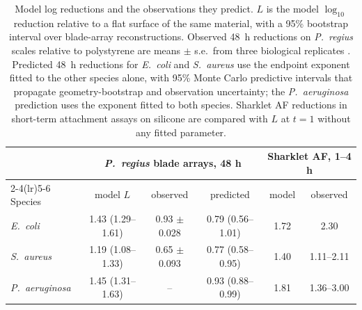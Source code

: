 \begin{table}[t]
\centering
\caption{Model log reductions and the observations they predict. $L$ is the model $\log_{10}$ reduction relative to a flat surface of the same material, with a 95\% bootstrap interval over \EnsN{} blade-array reconstructions. Observed 48~h reductions on \textit{P.~regius} scales relative to polystyrene are means $\pm$ s.e.\ from three biological replicates \cite{Peroutka2026}. Predicted 48~h reductions for \textit{E.~coli} and \textit{S.~aureus} use the endpoint exponent fitted to the other species alone, with 95\% Monte Carlo predictive intervals that propagate geometry-bootstrap and observation uncertainty; the \textit{P.~aeruginosa} prediction uses the exponent fitted to both species. Sharklet AF reductions in short-term attachment assays on silicone \cite{May2014,Xu2017} are compared with $L$ at $t=1$ without any fitted parameter.}
\label{tab:main}
\small
\begin{tabular}{lccccc}
\toprule
 & \multicolumn{3}{c}{\textit{P.~regius} blade arrays, 48 h} & \multicolumn{2}{c}{Sharklet AF, 1--4 h}\\
\cmidrule(lr){2-4}\cmidrule(lr){5-6}
Species & model $L$ & observed & predicted & model & observed \\
\midrule
\textit{E.~coli} & 1.43 (1.29--1.61) & 0.93 $\pm$ 0.028 & 0.79 (0.56--1.01) & 1.72 & 2.30 \\
\textit{S.~aureus} & 1.19 (1.08--1.33) & 0.65 $\pm$ 0.093 & 0.77 (0.58--0.95) & 1.40 & 1.11--2.11 \\
\textit{P.~aeruginosa} & 1.45 (1.31--1.63) & -- & 0.93 (0.88--0.99) & 1.81 & 1.36--3.00 \\
\bottomrule
\end{tabular}
\end{table}
